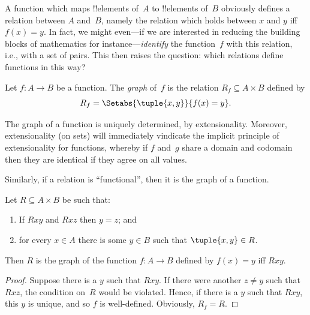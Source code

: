 \documentclass[../../../include/open-logic-section]{subfiles}
\begin{document}


\begin{explain} 
A function which maps !!{element}s of~$A$ to !!{element}s of~$B$
obviously defines a relation between $A$ and~$B$, namely the relation
which holds between $x$ and $y$ iff $f(x) = y$.  In fact, we might
even---if we are interested in reducing the building blocks of
mathematics for instance---\emph{identify} the function~$f$ with this
relation, i.e., with a set of pairs.  This then raises the question:
which relations define functions in this way?
\end{explain}

\begin{defn} Let $f\colon A \to B$ be a function.
The \emph{graph} of~$f$ is the relation $R_f \subseteq A \times B$
defined by
\[
R_f = \Setabs{\tuple{x,y}}{f(x) = y}.
\]
\end{defn}

\begin{explain}
The graph of a function is uniquely determined, by extensionality.
Moreover, extensionality (on sets) will immediately vindicate the
implicit principle of extensionality for functions,
whereby if $f$ and~$g$ share a domain and codomain then they are
identical if they agree on all values. 

Similarly, if a relation is ``functional'', then it is the graph of a function. 
\end{explain}

\begin{prop}
Let $R \subseteq A \times B$ be such that:
\begin{enumerate}
\item If $Rxy$ and $Rxz$ then $y = z$; and 
\item for every $x \in A$ there is some $y \in B$ such that $\tuple{x,
y} \in R$.  
\end{enumerate}
Then $R$ is the graph of the function $f\colon A \to B$ defined by
$f(x) = y$ iff $Rxy$. 
\end{prop}

\begin{proof}
Suppose there is a $y$ such that $Rxy$.  If there were another $z \neq
y$ such that $Rxz$, the condition on~$R$ would be violated. Hence, if
there is a $y$ such that $Rxy$, this $y$ is unique, and so $f$ is
well-defined.  Obviously, $R_f = R$.
\end{proof}
\end{document}
